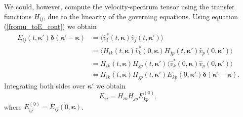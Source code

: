 \documentclass[oneside,a4paper,11pt]{report}
\newcommand{\kappavec}{\boldsymbol{\kappa}}
\begin{document}
We could, however, compute the velocity-spectrum tensor using the transfer functions $H_{ij}$, due to the linearity of the governing equations. Using equation (\ref{fromu_toE_cont}) we obtain
\begin{align}
E_{ij}(t,\kappavec') \boldsymbol{\delta}(\kappavec' - \kappavec) & = \langle \hat{v}^*_i(t,\kappavec) \hat{v}_j(t,\kappavec') \rangle \nonumber \\
& = \langle H_{ik}(t,\kappavec) \hat{v}_k^*(0,\kappavec) H_{jp}(t,\kappavec') \hat{v}_p(0,\kappavec') \rangle \nonumber \\
& = H_{ik}(t,\kappavec) H_{jp}(t,\kappavec') \langle \hat{v}_k^*(0,\kappavec) \hat{v}_p(0,\kappavec') \rangle \nonumber \\
& = H_{ik}(t,\kappavec) H_{jp}(t,\kappavec') E_{kp}(0,\kappavec') \boldsymbol{\delta}(\kappavec' - \kappavec).
\end{align}
Integrating both sides over $\kappavec'$ we obtain
\begin{equation}
E_{ij} = H_{ik} H_{jp} E_{kp}^{(0)},
\end{equation}
where $E_{ij}^{(0)} = E_{ij}(0,\kappavec)$.
\end{document}
